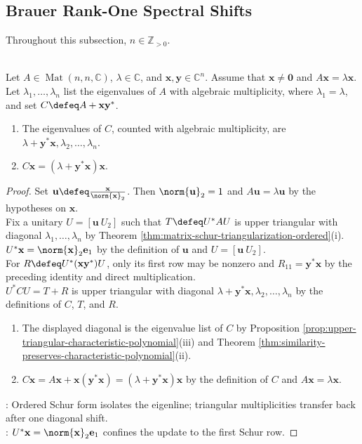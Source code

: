 \subsection{Brauer Rank-One Spectral Shifts}

Throughout this subsection, $n\in\mathbb{Z}_{>0}$.

\begin{theorem} \label{thm:brauer-rank-one-eigenvalue-shift} \\
Let $A\in\operatorname{Mat}(n,n,\mathbb{C})$, $\lambda\in\mathbb{C}$, and $\mathbf{x},\mathbf{y}\in\mathbb{C}^n$. Assume that $\mathbf{x}\neq\mathbf{0}$ and $A\mathbf{x}=\lambda\mathbf{x}$.\\
Let $\lambda_1,\ldots,\lambda_n$ list the eigenvalues of $A$ with algebraic multiplicity, where $\lambda_1=\lambda$, and set $C\defeq A+\mathbf{x}\mathbf{y}^*$.
\begin{enumerate}[label=(\roman*)]
\setlength{\itemsep}{0pt}
\item The eigenvalues of $C$, counted with algebraic multiplicity, are $\lambda+\mathbf{y}^*\mathbf{x},\lambda_2,\ldots,\lambda_n$.
\item $C\mathbf{x}=(\lambda+\mathbf{y}^*\mathbf{x})\mathbf{x}$.
\end{enumerate}
\begin{proof}
Set $\mathbf{u}\defeq\frac{\mathbf{x}}{\norm{\mathbf{x}}_2}$. Then $\norm{\mathbf{u}}_2=1$ and $A\mathbf{u}=\lambda\mathbf{u}$ by the hypotheses on $\mathbf{x}$.\\
Fix a unitary $U=[\mathbf{u}\ U_2]$ such that $T\defeq U^*AU$ is upper triangular with diagonal $\lambda_1,\ldots,\lambda_n$ by Theorem \ref{thm:matrix-schur-triangularization-ordered}(i).\\
$U^*\mathbf{x}=\norm{\mathbf{x}}_2\mathbf{e}_1$ by the definition of $\mathbf{u}$ and $U=[\mathbf{u}\ U_2]$.\\
For $R\defeq U^*(\mathbf{x}\mathbf{y}^*)U$, only its first row may be nonzero and $R_{11}=\mathbf{y}^*\mathbf{x}$ by the preceding identity and direct multiplication.\\
$U^*CU=T+R$ is upper triangular with diagonal $\lambda+\mathbf{y}^*\mathbf{x},\lambda_2,\ldots,\lambda_n$ by the definitions of $C$, $T$, and $R$.
\begin{enumerate}[label=(\roman*)]
\setlength{\itemsep}{0pt}
\item The displayed diagonal is the eigenvalue list of $C$ by Proposition \ref{prop:upper-triangular-characteristic-polynomial}(iii) and Theorem \ref{thm:similarity-preserves-characteristic-polynomial}(ii).
\item $C\mathbf{x}=A\mathbf{x}+\mathbf{x}(\mathbf{y}^*\mathbf{x})=(\lambda+\mathbf{y}^*\mathbf{x})\mathbf{x}$ by the definition of $C$ and $A\mathbf{x}=\lambda\mathbf{x}$.
\end{enumerate}
: Ordered Schur form isolates the eigenline; triangular multiplicities transfer back after one diagonal shift.\\
: $U^*\mathbf{x}=\norm{\mathbf{x}}_2\mathbf{e}_1$ confines the update to the first Schur row.
\end{proof}
\end{theorem}

